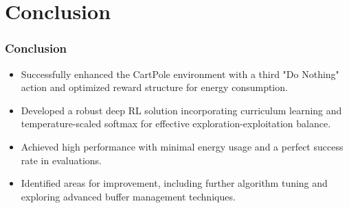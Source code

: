 \documentclass{beamer}
\begin{document}
\section{Conclusion}

\begin{frame}
\frametitle{Conclusion}
\begin{itemize}
    \item Successfully enhanced the CartPole environment with a third "Do Nothing" action and optimized reward structure for energy consumption.
    \item Developed a robust deep RL solution incorporating curriculum learning and temperature-scaled softmax for effective exploration-exploitation balance.
    \item Achieved high performance with minimal energy usage and a perfect success rate in evaluations.
    \item Identified areas for improvement, including further algorithm tuning and exploring advanced buffer management techniques.
\end{itemize}
\end{frame}
\end{document}
